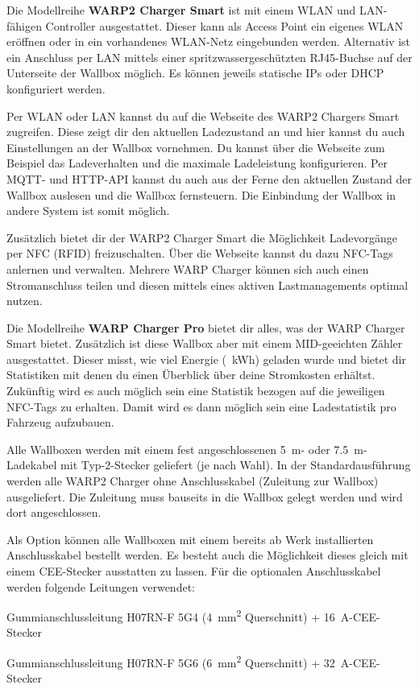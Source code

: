 \documentclass[a4paper,10pt]{article}
\begin{document}
\begin{multicols*}{2}
	Die Modellreihe \textbf{WARP2 Charger Smart} ist mit einem WLAN und
	LAN-fähigen Controller ausgestattet.
	Dieser kann als \nohyphens{Access} Point ein eigenes WLAN eröffnen oder in
	ein vorhandenes WLAN-Netz eingebunden werden. Alternativ ist ein Anschluss
	per LAN mittels einer spritzwassergeschützten RJ45-Buchse auf der
	Unterseite der Wallbox möglich. Es können jeweils statische IPs oder DHCP
	konfiguriert werden.

	Per WLAN oder LAN kannst du auf die Webseite des WARP2 Chargers Smart
	zugreifen. Diese zeigt dir den aktuellen Ladezustand an und hier kannst du
	auch Einstellungen an der Wallbox vornehmen. Du kannst über die Webseite 
	zum Beispiel das Ladeverhalten und die maximale Ladeleistung konfigurieren.
	Per MQTT- und HTTP-API kannst du auch aus der Ferne den aktuellen Zustand 
	der Wallbox auslesen und die Wallbox fernsteuern. 
	Die Einbindung der Wallbox in andere System ist somit möglich.

	Zusätzlich bietet dir der WARP2 Charger Smart die Möglichkeit Ladevorgänge
	per NFC (RFID) freizuschalten. Über die Webseite kannst du dazu NFC-Tags
	anlernen und verwalten. Mehrere WARP Charger können sich auch einen 
	Stromanschluss teilen und diesen mittels eines aktiven Lastmanagements optimal
	nutzen.

	Die Modellreihe \textbf{WARP Charger Pro} bietet dir alles, was der WARP Charger Smart
	bietet. Zusätzlich ist diese Wallbox aber mit einem MID-geeichten Zähler
	ausgestattet. Dieser misst, wie viel Energie (\SI{}{\kWh}) geladen
	wurde und bietet dir Statistiken mit denen du einen Überblick über deine
	Stromkosten erhältst. Zukünftig wird es auch möglich sein eine Statistik
	bezogen auf die jeweiligen NFC-Tags zu erhalten. Damit wird es dann möglich
	sein eine Ladestatistik pro Fahrzeug aufzubauen.

	Alle Wallboxen werden mit einem fest angeschlossenen
	\SI{5}{\meter}- oder \SI{7,5}{\meter}-Ladekabel mit Typ-2-Stecker geliefert
	(je nach Wahl).
	In der Standardausführung werden alle WARP2 Charger ohne Anschlusskabel
	(Zuleitung zur Wallbox) ausgeliefert. Die Zuleitung muss bauseits in die
	Wallbox gelegt werden und wird dort angeschlossen.

	Als Option können alle Wallboxen mit einem bereits ab Werk
	installierten Anschlusskabel bestellt werden. Es besteht auch die
	Möglichkeit dieses gleich mit einem CEE-Stecker ausstatten zu lassen.
	Für die optionalen Anschlusskabel werden folgende Leitungen verwendet:

	\begin{description}[leftmargin=!,labelwidth=\widthof{\textbf{\SI{22}{\kilo\watt}}}]
		\item[\SI{11}{\kilo\watt}]Gummianschlussleitung H07RN-F 5G4
		      (\SI{4}{\square\milli\meter}
		      Querschnitt) + \SI{16}{\ampere}-CEE-Stecker
		\item[\SI{22}{\kilo\watt}]Gummianschlussleitung H07RN-F 5G6
		      (\SI{6}{\square\milli\meter}
		      Querschnitt) + \SI{32}{\ampere}-CEE-Stecker
	\end{description}


\end{multicols*}
\end{document}
